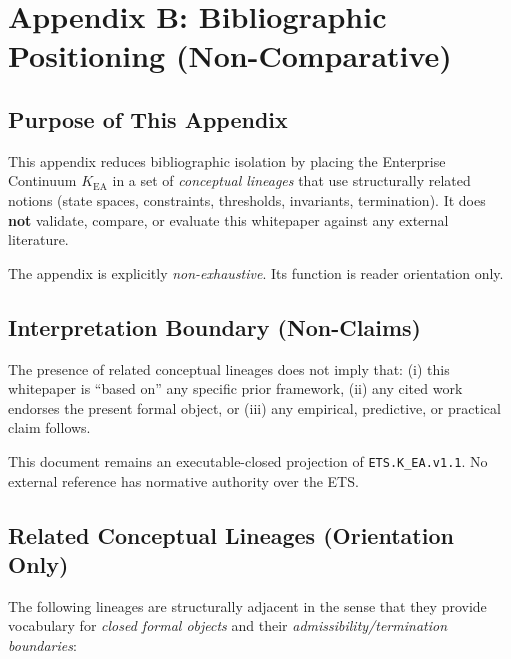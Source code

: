 
\section*{Appendix B: Bibliographic Positioning (Non-Comparative)}

\subsection*{Purpose of This Appendix}

This appendix reduces bibliographic isolation by placing the
Enterprise Continuum $K_{\mathrm{EA}}$ in a set of
\emph{conceptual lineages} that use structurally related notions
(state spaces, constraints, thresholds, invariants, termination).
It does \textbf{not} validate, compare, or evaluate this whitepaper
against any external literature.

The appendix is explicitly \emph{non-exhaustive}. Its function is
reader orientation only.

\subsection*{Interpretation Boundary (Non-Claims)}

The presence of related conceptual lineages does not imply that:
(i) this whitepaper is ``based on'' any specific prior framework,
(ii) any cited work endorses the present formal object, or
(iii) any empirical, predictive, or practical claim follows.

This document remains an executable-closed projection of
\texttt{ETS.K\_EA.v1.1}. No external reference has normative authority
over the ETS.

\subsection*{Related Conceptual Lineages (Orientation Only)}

The following lineages are structurally adjacent in the sense that they
provide vocabulary for \emph{closed formal objects} and their
\emph{admissibility/termination boundaries}:

